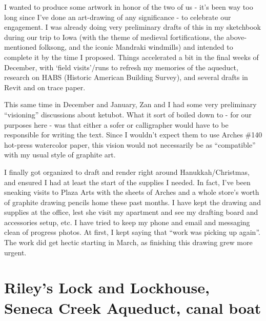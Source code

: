 ﻿\documentclass[letterpaper, 12pt, landscape]{ProgressBook}
\begin{document}
I wanted to produce some artwork in honor of the two of us - it's
been way too long since I've done an art-drawing of any significance - to
celebrate our engagement. I was already doing very preliminary drafts of this
in my sketchbook during our trip to Iowa (with the theme of medieval fortifications,
the above-mentioned folksong, and the iconic Mandraki windmills) and intended
to complete it by the time I proposed. Things accelerated a bit in the final
weeks of December, with `field visits'/runs to refresh my memories of the
aqueduct, research on HABS (Historic American Building Survey), and several
drafts in Revit and on trace paper.

This same time in December and January, Zan and I had some very
preliminary ``visioning'' discussions about ketubot. What it sort of
boiled down to - for our purposes here - was that either a sofer or
calligrapher would have to be responsible for writing the text. Since I
wouldn’t expect them to use Arches \#140 hot-press watercolor paper, this vision
would not necessarily be as ``compatible'' with my usual style of
graphite art.

I finally got organized to draft and render right around
Hanukkah/Christmas, and ensured I had at least the start of the supplies I
needed. In fact, I’ve been sneaking visits to Plaza Arts with the sheets of
Arches and a whole store’s worth of graphite drawing pencils home these past
months. I have kept the drawing and supplies at the office, lest she visit my
apartment and see my drafting board and accessories setup, etc.
I have tried to keep my phone and email and messaging clean of
progress photos. At first, I kept saying that ``work was picking up again''.
The work did get hectic starting in March, as finishing this drawing grew more
urgent.

\section*{Riley’s Lock and Lockhouse, Seneca Creek Aqueduct, canal boat}
\end{document}
